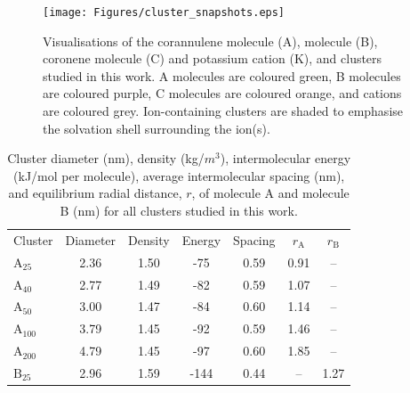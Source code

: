 %
\begin{figure}[!tbph]
\centering
\texttt{[image: Figures/cluster\_snapshots.eps]}
\caption{Visualisations of the corannulene molecule (A),  molecule (B), coronene molecule (C) and potassium cation (K), and clusters studied in this work. A molecules are coloured green, B molecules are coloured purple, C molecules are coloured orange, and  cations are coloured grey. Ion-containing clusters are shaded to emphasise the solvation shell surrounding the ion(s).}
\label{fig:clustersnapshots}
\end{figure}
%
\begin{table}[ht]
\centering
\caption{Cluster diameter (nm), density (kg/$m^3$), intermolecular energy (kJ/mol per molecule), average intermolecular spacing (nm), and equilibrium radial distance, $r$, of molecule A and molecule B (nm) for all clusters studied in this work.} %
\label{table:maintable}
\begin{tabular}{lcccccc}
\hline
\multicolumn{1}{l}{\multirow{2}{*}{Cluster}} & \multicolumn{1}{c}{\multirow{2}{*}{Diameter}} & \multicolumn{1}{c}{\multirow{2}{*}{Density}} & \multicolumn{1}{c}{\multirow{2}{*}{Energy}} & \multicolumn{1}{c}{\multirow{2}{*}{Spacing}} & \multicolumn{1}{c}{\multirow{2}{*}{$r_{\text{A}}$}} & 
\multicolumn{1}{c}{\multirow{2}{*}{$r_{\text{B}}$}} \\ 
\multicolumn{1}{c}{} & \multicolumn{1}{c}{} & \multicolumn{1}{c}{} & \multicolumn{1}{c}{} & \multicolumn{1}{c}{} & \multicolumn{1}{c}{} & \multicolumn{1}{c}{} \\ \hline
$\text{A}_{\text{25}}$ & 2.36 & 1.50 & -75 & 0.59 &  0.91 & -- \\
$\text{A}_{\text{40}}$ & 2.77 & 1.49 & -82 & 0.59 & 1.07 & -- \\
$\text{A}_{\text{50}}$ & 3.00 & 1.47 & -84 & 0.60 & 1.14 & -- \\
$\text{A}_{\text{100}}$ & 3.79 & 1.45 & -92 & 0.59 & 1.46 & -- \\
$\text{A}_{\text{200}}$ & 4.79 & 1.45 & -97 & 0.60 & 1.85 & -- \\ \hline
$\text{B}_{\text{25}}$ & 2.96 & 1.59 & -144 & 0.44 & -- & 1.27 \\

\end{tabular}
\end{table}
